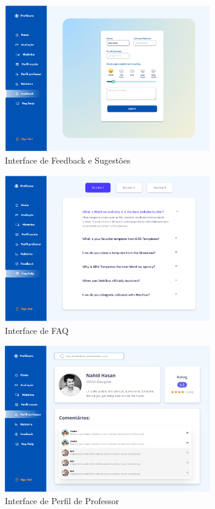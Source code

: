 \documentclass[12pt]{article}
\begin{document}
\begin{figure}[H] %
  \centering
  \includegraphics[width=0.8\textwidth]{interfaces/i9-feedback.png}
  \caption{Interface de Feedback e Sugestões}
  \label{fig:i9-feedback}
\end{figure}

\begin{figure}[H] %
  \centering
  \includegraphics[width=0.8\textwidth]{interfaces/i10-faq.png}
  \caption{Interface de FAQ}
  \label{fig:i10-faq}
\end{figure}

\begin{figure}[H] %
  \centering
  \includegraphics[width=0.8\textwidth]{interfaces/i11-perfil-prof.png}
  \caption{Interface de Perfil de Professor}
  \label{fig:i11-perfil-prof}
\end{figure}
\end{document}
